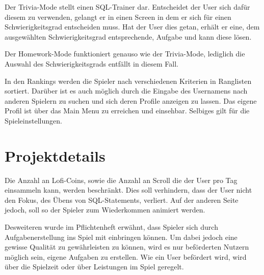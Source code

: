 Der Trivia-Mode stellt einen SQL-Trainer dar. Entscheidet der User sich dafür diesem zu verwenden, gelangt er in einen Screen in dem er sich für einen Schwierigkeitsgrad entscheiden muss. Hat der User dies getan, erhält er eine, dem ausgewählten Schwierigkeitsgrad entsprechende, Aufgabe und kann diese lösen.

Der Homework-Mode funktioniert genauso wie der Trivia-Mode, lediglich die Auswahl des Schwierigkeitsgrads entf\"allt in diesem Fall.

In den Rankings werden die Spieler nach verschiedenen Kriterien in Ranglisten sortiert. Darüber ist es auch möglich durch die Eingabe des Usernamens nach anderen Spielern zu suchen und sich deren Profile anzeigen zu lassen.
Das eigene Profil ist über das Main Menu zu erreichen und einsehbar. Selbiges gilt für die Spieleinstellungen.  



\section{Projektdetails}

Die Anzahl an Lofi-Coins, sowie die Anzahl an Scroll die der User pro Tag einsammeln kann, werden beschr\"ankt.
Dies soll verhindern, dass der User nicht den Fokus, des \"Ubens von SQL-Statements, verliert. Auf der anderen Seite jedoch, soll so der Spieler zum Wiederkommen
animiert werden.

Desweiteren wurde im Pflichtenheft erwähnt, dass Spieler sich durch Aufgabenerstellung ins Spiel mit einbringen können. Um dabei jedoch eine gewisse Qualität zu gewährleisten zu k\"onnen, wird es nur beförderten Nutzern möglich sein, eigene Aufgaben zu erstellen. Wie ein User befördert wird, wird über die Spielzeit oder über Leistungen im Spiel geregelt.  




